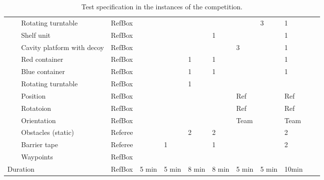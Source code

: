 \begin{landscape}
\begin{table}[h!]
\begin{tabular}{|l|l|l|l*{9}{|P{1cm}}|}
      &  & Rotating turntable& RefBox  &       &       &       &       &        & 3  & 1   \\ 
      \hhline{~-----------} 
      & 
         & Shelf unit          & RefBox &       &       &      &   1     &        &   & 1   \\ \hhline{~~----------}
      &  & Cavity platform with decoy& RefBox &       &       &       &       &  3   &   & 1   \\ \hhline{~~----------}
      &  & Red container       & RefBox &       &       &   1   &   1   &       &   & 1   \\ \hhline{~~----------}
      &  & Blue container      & RefBox &       &       &   1   &   1   &       &   & 1   \\ \hhline{~~----------}
      &  & Rotating turntable  & RefBox &       &       &   1   &      &       &   &    \\ 
      \hhline{------------} \hhline{------------}
      & 
         & Position     & RefBox &       &       &      &      &   Ref	  &   &  Ref   \\ \hhline{~~----------}
      &  & Rotatoion	& RefBox &       &       &      &      &   Ref    &   &  Ref   \\ \hhline{~~----------}
      &  & Orientation	& RefBox &       &       &      &      &   Team   &   &  Team  \\ 
    \hhline{~-----------} \hhline{~-----------}
     & 
     &     Obstacles (static) & Referee &       &       &   2   &   2   &       &   & 2   \\ \hhline{~~----------}
     &   & Barrier tape       & Referee &       &   1   &       &    1    &       &   & 2   \\ \hhline{~~----------}
     &   & Waypoints          & RefBox  &       &       &       &       &       &   &    \\ 
		\hline \hline
		 \multicolumn{3}{|l|}{Duration} 
		                    & RefBox & 5 min & 5 min  &   8 min &   8 min & 5 min & 5 min & 10min \\
		\hline
 \end{tabular}
 \caption{Test specification in the instances of the \RCAW \YEAR competition.}
 \label{tab:Instances}
\end{table}
\end{landscape}


